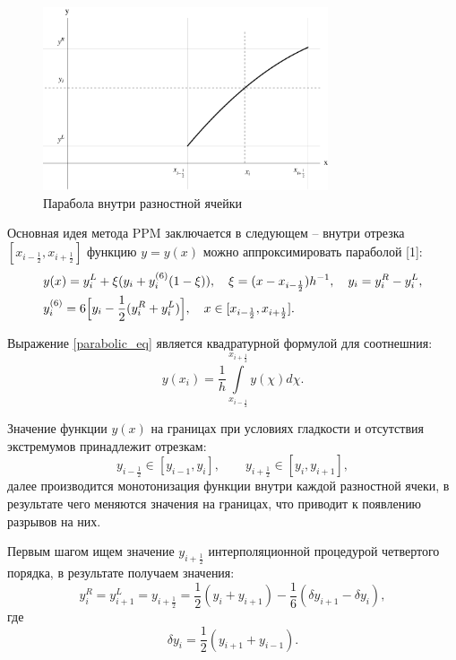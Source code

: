 \documentclass[12pt,a4paper]{article}
\newcommand{\half}{\frac{1}{2}}
\newcommand{\dhalf}{\dfrac{1}{2}}
\begin{document}
    \begin{figure}[h]
        \centering
        \includegraphics[width=0.75\textwidth]{ppm_visual.pdf}
        \caption{Парабола внутри разностной ячейки}
        \label{fig:ppm_visual}
    \end{figure}

    Основная идея метода PPM заключается в следующем -- внутри отрезка $ [x_{i-\half}, x_{i+\half}] $ функцию $ y = y(x) $ можно аппроксимировать параболой [1]:
    \begin{equation}
    \begin{split}
        \label{parabolic_eq}
        &y(x) = y_i^L + \xi(\Delta y_i + y_i^{(6)}(1 - \xi)), \quad \xi = (x - x_{i-\half})h^{-1}, \quad  \Delta y_i = y_i^R-y_i^L, \\
        &y_i^{(6)} = 6\Bigl[ y_i - \half(y_i^R + y_i^L)\Bigr], \quad x \in [x_{i-\half}, x_{i + \half}].
    \end{split}
    \end{equation}

    Выражение \eqref{parabolic_eq} является квадратурной формулой для соотнешния:
    \[
        y(x_i) = \dfrac{1}{h} \displaystyle \int\limits_{x_{i-\half}}^{x_{i+\half}} y(\chi) d\chi.
    \]

   Значение функции $ y(x) $ на границах при условиях гладкости и отсутствия экстремумов принадлежит отрезкам:
   \begin{equation}
        \label{ppm_boundary}
        y_{i-\half} \in [y_{i-1}, y_i], \qquad y_{i+\half} \in [y_i, y_{i+1}], 
   \end{equation}
   \noindent далее производится монотонизация функции внутри каждой разностной ячеки, в результате чего меняются значения на границах, что приводит к появлению разрывов на них.

   Первым шагом ищем значение $y_{i+\half}$ интерполяционной процедурой четвертого порядка, в результате получаем значения:
   \[
        y_i^R = y_{i+1}^L = y_{i+\half} = \dhalf(y_i + y_{i+1}) - \dfrac{1}{6}(\delta y_{i+1} - \delta y_i),
   \] 
   \noindent где 
   \[
        \delta y_i = \dhalf(y_{i+1} + y_{i-1}).
   \]
\end{document}
